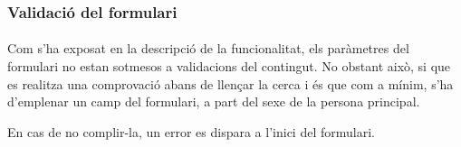 \subsubsection{Validació del formulari}

\paragraph{}
Com s'ha exposat en la descripció de la funcionalitat, els paràmetres del formulari no estan sotmesos a validacions del contingut. No obstant això, si que es realitza una comprovació abans de llençar la cerca i és que com a mínim, s'ha d’emplenar un camp del formulari, a part del sexe de la persona principal.

En cas de no complir-la, un error es dispara a l’inici del formulari.
